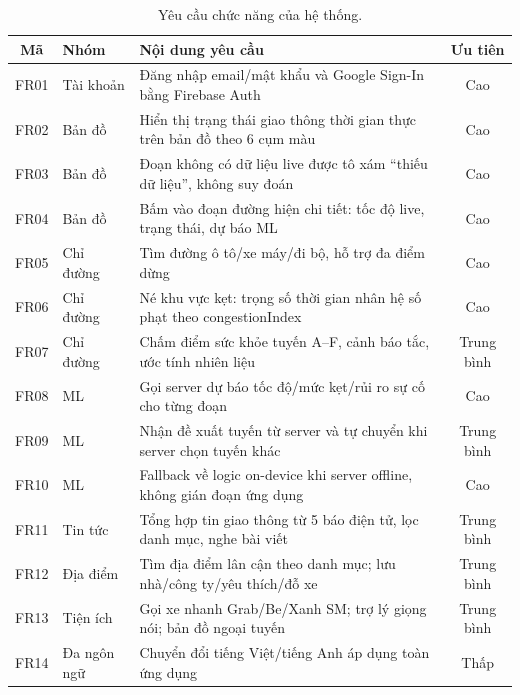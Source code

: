 \begin{table}[h!]
\centering
\caption{Yêu cầu chức năng của hệ thống.}
\label{tab:fr}
\small
\begin{tabularx}{\textwidth}{clXc}
\toprule
\textbf{Mã} & \textbf{Nhóm} & \textbf{Nội dung yêu cầu} & \textbf{Ưu tiên}\\
\midrule
FR01 & Tài khoản & Đăng nhập email/mật khẩu và Google Sign-In bằng Firebase Auth & Cao\\
FR02 & Bản đồ & Hiển thị trạng thái giao thông thời gian thực trên bản đồ theo 6 cụm màu & Cao\\
FR03 & Bản đồ & Đoạn không có dữ liệu live được tô xám ``thiếu dữ liệu'', không suy đoán & Cao\\
FR04 & Bản đồ & Bấm vào đoạn đường hiện chi tiết: tốc độ live, trạng thái, dự báo ML & Cao\\
FR05 & Chỉ đường & Tìm đường ô tô/xe máy/đi bộ, hỗ trợ đa điểm dừng & Cao\\
FR06 & Chỉ đường & Né khu vực kẹt: trọng số thời gian nhân hệ số phạt theo congestionIndex & Cao\\
FR07 & Chỉ đường & Chấm điểm sức khỏe tuyến A--F, cảnh báo tắc, ước tính nhiên liệu & Trung bình\\
FR08 & ML & Gọi server dự báo tốc độ/mức kẹt/rủi ro sự cố cho từng đoạn & Cao\\
FR09 & ML & Nhận đề xuất tuyến từ server và tự chuyển khi server chọn tuyến khác & Trung bình\\
FR10 & ML & Fallback về logic on-device khi server offline, không gián đoạn ứng dụng & Cao\\
FR11 & Tin tức & Tổng hợp tin giao thông từ 5 báo điện tử, lọc danh mục, nghe bài viết & Trung bình\\
FR12 & Địa điểm & Tìm địa điểm lân cận theo danh mục; lưu nhà/công ty/yêu thích/đỗ xe & Trung bình\\
FR13 & Tiện ích & Gọi xe nhanh Grab/Be/Xanh SM; trợ lý giọng nói; bản đồ ngoại tuyến & Trung bình\\
FR14 & Đa ngôn ngữ & Chuyển đổi tiếng Việt/tiếng Anh áp dụng toàn ứng dụng & Thấp\\
\bottomrule
\end{tabularx}
\end{table}

